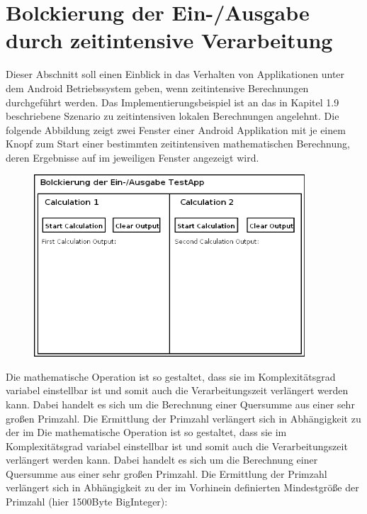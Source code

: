 \documentclass[12pt,oneside,a4paper,bibtotoc,liststotoc]{scrreprt}
\begin{document}
\section{Bolckierung der Ein-/Ausgabe durch zeitintensive Verarbeitung}
Dieser Abschnitt soll einen Einblick in das Verhalten von Applikationen unter dem Android Betriebssystem geben, wenn zeitintensive Berechnungen durchgeführt werden. Das Implementierungsbeispiel ist an das in Kapitel 1.9 beschriebene Szenario zu zeitintensiven lokalen Berechnungen angelehnt.
Die folgende Abbildung zeigt zwei Fenster einer Android Applikation mit je einem Knopf zum Start einer bestimmten zeitintensiven mathematischen Berechnung, deren Ergebnisse auf im jeweiligen Fenster angezeigt wird.
\begin{figure}[H]
  \begin{centering}
    \includegraphics[width=0.9\textwidth]{img/BlockingIO_testApp_Mockup.png}
    \label{BlockingIO_testApp_Mockup}
  \end{centering}
\end{figure}
Die mathematische Operation ist so gestaltet, dass sie im Komplexitätsgrad variabel einstellbar ist und somit auch die Verarbeitungszeit verlängert werden kann. Dabei handelt es sich um die Berechnung einer Quersumme aus einer sehr großen Primzahl. Die Ermittlung der Primzahl verlängert sich in Abhängigkeit zu der im Die mathematische Operation ist so gestaltet, dass sie im Komplexitätsgrad variabel einstellbar ist und somit auch die Verarbeitungszeit verlängert werden kann. Dabei handelt es sich um die Berechnung einer Quersumme aus einer sehr großen Primzahl. Die Ermittlung der Primzahl verlängert sich in Abhängigkeit zu der im Vorhinein definierten Mindestgröße der Primzahl (hier 1500Byte BigInteger):\newline\newline
\end{document}
